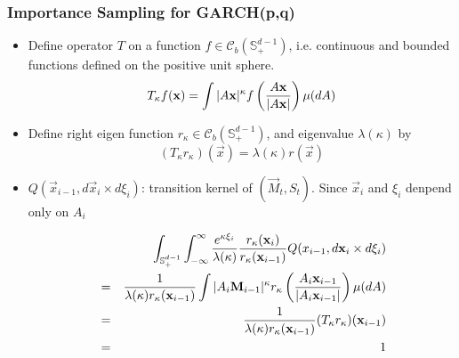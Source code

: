 \documentclass{beamer}
\begin{document}
\begin{frame}
  \frametitle{Importance Sampling for GARCH(p,q)}
  \begin{itemize}
  \item Define operator $T$ on a function $f \in \mathscr C_b(\mathbb
    S^{d-1}_+)$, i.e. continuous and bounded functions defined on the
    positive unit sphere.
    \[
    T_\kappa f(\vec x) = \int |A \vec x|^\kappa
    f\left({A \vec x \over |A \vec x|}\right) \mu(dA)
    \]
  \item Define right eigen function $r_\kappa \in \mathscr C_b(\mathbb
    S^{d-1}_+)$, and eigenvalue $\lambda(\kappa)$ by
    \[
    (T_\kappa r_\kappa)(\vec x) = \lambda(\kappa) r(\vec x)
    \]
  \item $Q(\vec x_{i-1}, d\vec x_{i} \times d\xi_{i})$: transition kernel of
    $(\vec M_t, S_t)$. Since $\vec x_i$ and $\xi_i$ denpend only on
    $A_i$
    \begin{scriptsize}
      \begin{eqnarray*}
        && \int_{\mathbb S_+^{d-1}} \int_{-\infty}^\infty
        {e^{\kappa \xi_i} \over \lambda(\kappa)}
        {r_\kappa(\vec x_i) \over r_\kappa(\vec x_{i-1})}
        Q(x_{i-1}, d\vec x_{i} \times d\xi_{i}) \\
        &=&
        {1 \over \lambda(\kappa) r_\kappa(\vec x_{i-1})}
        \int |A_i \vec M_{i-1}|^\kappa
        r_\kappa\left(
          { A_i \vec x_{i-1}
            \over
            |A_i \vec x_{i-1}|
          }
        \right) \mu(dA) \\
        &=& 
        {1 \over \lambda(\kappa) r_\kappa(\vec x_{i-1})}
        (T_\kappa r_\kappa)(\vec x_{i-1}) \\
        &=& 1
      \end{eqnarray*}
    \end{scriptsize}
  \end{itemize}
\end{frame}
\end{document}
